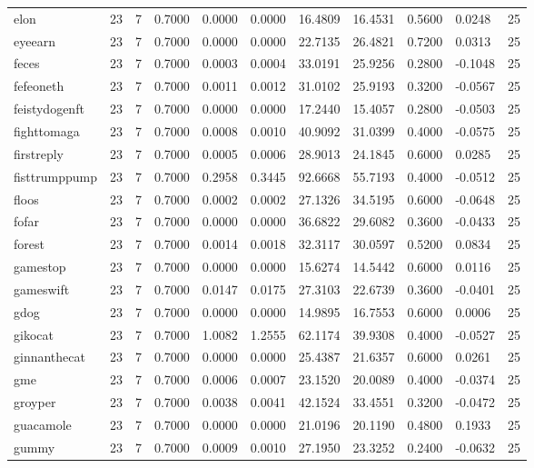 \begin{table}[htbp]
\begin{tabular}{lllllllllll}
elon & 23 & 7 & 0.7000 & 0.0000 & 0.0000 & 16.4809 & 16.4531 & 0.5600 & 0.0248 & 25 \\
eyeearn & 23 & 7 & 0.7000 & 0.0000 & 0.0000 & 22.7135 & 26.4821 & 0.7200 & 0.0313 & 25 \\
feces & 23 & 7 & 0.7000 & 0.0003 & 0.0004 & 33.0191 & 25.9256 & 0.2800 & -0.1048 & 25 \\
fefeoneth & 23 & 7 & 0.7000 & 0.0011 & 0.0012 & 31.0102 & 25.9193 & 0.3200 & -0.0567 & 25 \\
feistydogenft & 23 & 7 & 0.7000 & 0.0000 & 0.0000 & 17.2440 & 15.4057 & 0.2800 & -0.0503 & 25 \\
fighttomaga & 23 & 7 & 0.7000 & 0.0008 & 0.0010 & 40.9092 & 31.0399 & 0.4000 & -0.0575 & 25 \\
firstreply & 23 & 7 & 0.7000 & 0.0005 & 0.0006 & 28.9013 & 24.1845 & 0.6000 & 0.0285 & 25 \\
fisttrumppump & 23 & 7 & 0.7000 & 0.2958 & 0.3445 & 92.6668 & 55.7193 & 0.4000 & -0.0512 & 25 \\
floos & 23 & 7 & 0.7000 & 0.0002 & 0.0002 & 27.1326 & 34.5195 & 0.6000 & -0.0648 & 25 \\
fofar & 23 & 7 & 0.7000 & 0.0000 & 0.0000 & 36.6822 & 29.6082 & 0.3600 & -0.0433 & 25 \\
forest & 23 & 7 & 0.7000 & 0.0014 & 0.0018 & 32.3117 & 30.0597 & 0.5200 & 0.0834 & 25 \\
gamestop & 23 & 7 & 0.7000 & 0.0000 & 0.0000 & 15.6274 & 14.5442 & 0.6000 & 0.0116 & 25 \\
gameswift & 23 & 7 & 0.7000 & 0.0147 & 0.0175 & 27.3103 & 22.6739 & 0.3600 & -0.0401 & 25 \\
gdog & 23 & 7 & 0.7000 & 0.0000 & 0.0000 & 14.9895 & 16.7553 & 0.6000 & 0.0006 & 25 \\
gikocat & 23 & 7 & 0.7000 & 1.0082 & 1.2555 & 62.1174 & 39.9308 & 0.4000 & -0.0527 & 25 \\
ginnanthecat & 23 & 7 & 0.7000 & 0.0000 & 0.0000 & 25.4387 & 21.6357 & 0.6000 & 0.0261 & 25 \\
gme & 23 & 7 & 0.7000 & 0.0006 & 0.0007 & 23.1520 & 20.0089 & 0.4000 & -0.0374 & 25 \\
groyper & 23 & 7 & 0.7000 & 0.0038 & 0.0041 & 42.1524 & 33.4551 & 0.3200 & -0.0472 & 25 \\
guacamole & 23 & 7 & 0.7000 & 0.0000 & 0.0000 & 21.0196 & 20.1190 & 0.4800 & 0.1933 & 25 \\
gummy & 23 & 7 & 0.7000 & 0.0009 & 0.0010 & 27.1950 & 23.3252 & 0.2400 & -0.0632 & 25 \\

\end{tabular}
\end{table}
